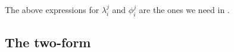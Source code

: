 \documentclass[11pt]{article}
\theoremstyle{plain}
\theoremstyle{definition}
\begin{document}

The above expressions for $\lambda^j_i$ and $\phi^j_i$ are the ones we need in .

\subsection{The two-form}
\end{document}
